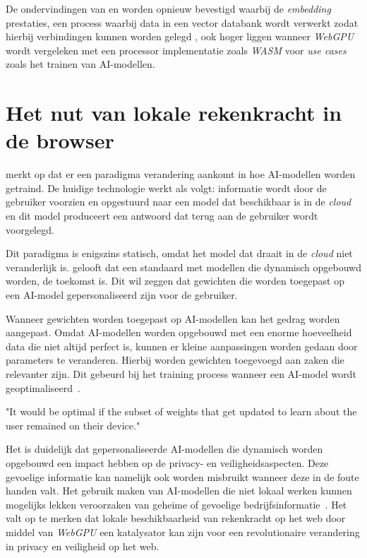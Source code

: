 \bigbreak{}

De ondervindingen van \textcite{Wallez2023} en \textcite{Radin2021} worden opnieuw bevestigd waarbij de \textit{embedding} prestaties, een process waarbij data in een vector databank wordt verwerkt zodat hierbij verbindingen kunnen worden gelegd \autocite{Cloudflare2024, Cloudflare2024a, Huyen2023}, ook hoger liggen wanneer \textit{WebGPU} wordt vergeleken met een processor implementatie zoals \textit{WASM} voor \textit{use cases} zoals het trainen van AI-modellen.

\break{}

\section{Het nut van lokale rekenkracht in de browser} 

\textcite{Fleetwood2022} merkt op dat er een paradigma verandering aankomt in hoe AI-modellen worden getraind. De huidige technologie werkt als volgt: informatie wordt door de gebruiker voorzien en opgestuurd naar een model dat beschikbaar is in de \textit{cloud} en dit model produceert een antwoord dat terug aan de gebruiker wordt voorgelegd.

\bigbreak{}

Dit paradigma is enigszins statisch, omdat het model dat draait in de \textit{cloud} niet veranderlijk is. \textcite{Fleetwood2022} gelooft dat een standaard met modellen die dynamisch opgebouwd worden, de toekomst is. Dit wil zeggen dat gewichten die worden toegepast op een AI-model gepersonaliseerd zijn voor de gebruiker. 

\bigbreak{}

Wanneer gewichten worden toegepast op AI-modellen kan het gedrag worden aangepast. Omdat AI-modellen worden opgebouwd met een enorme hoeveelheid data die niet altijd perfect is, kunnen er kleine aanpassingen worden gedaan door parameters te veranderen. Hierbij worden gewichten toegevoegd aan zaken die relevanter zijn. Dit gebeurd bij het training process wanneer een AI-model wordt geoptimaliseerd~\autocite{Hubbard2024}.

\begin{displayquote}
    "It would be optimal if the subset of weights that get updated to learn about the user remained on their device."
\end{displayquote}

Het is duidelijk dat gepersonaliseerde AI-modellen die dynamisch worden opgebouwd een impact hebben op de privacy- en veiligheidsaspecten. Deze gevoelige informatie kan namelijk ook worden misbruikt wanneer deze in de foute handen valt. Het gebruik maken van AI-modellen die niet lokaal werken kunnen mogelijks lekken veroorzaken van geheime of gevoelige bedrijfsinformatie~\autocite{Wiggers2023, Sabin2023}. Het valt op te merken dat lokale beschikbaarheid van rekenkracht op het web door middel van \textit{WebGPU} een katalysator kan zijn voor een  revolutionaire verandering in privacy en veiligheid op het web.

